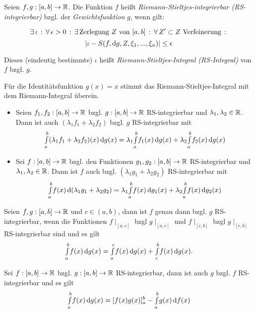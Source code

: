 \documentclass{cheat-sheet}
\begin{document}
\begin{defn}
Seien $f, g : [a, b] \to \mathbb{R}$. Die Funktion $f$ heißt \emph{Riemann-Stieltjes-integrierbar (RS-integrierbar)} bzgl. der \emph{Gewichtsfunktion} $g$, wenn gilt:

\[ \exists \, {\iota} \,:\, \forall \, {\epsilon > 0} \,:\, \exists \, {\text{Zerlegung $Z$ von $[a, b]$}} \,:\, \forall \, {Z' \subset Z \text{ Verfeinerung}} \,:\, \]
\[ \lvert\iota - S(f, \mathrm{d} g, Z, \xi_1, ..., \xi_n)\rvert \le \epsilon \]

Dieses (eindeutig bestimmte) $\iota$ heißt \emph{Riemann-Stieltjes-Integral (RS-Integral)} von $f$ bzgl. $g$.
\end{defn}

\begin{bem}
Für die Identitätsfunktion $g(x) = x$ stimmt das Riemann-Stieltjes-Integral mit dem Riemann-Integral überein.
\end{bem}


\begin{satz}
\begin{itemize}
  \item Seien $f_1, f_2 : [a, b] \to \mathbb{R}$ bzgl. $g : [a, b] \to \mathbb{R}$ RS-integrierbar und $\lambda_1, \lambda_2 \in \mathbb{R}$. Dann ist auch $(\lambda_1 f_1 + \lambda_2 f_2)$ bzgl. $g$ RS-integrierbar mit
  \[ {\textstyle \int\limits_{a}^{b}} (\lambda_1 f_1 + \lambda_2 f_2)(x) \,\mathrm{d} g(x) = \lambda_1 {\textstyle \int\limits_{a}^{b}} f_1(x) \,\mathrm{d} g(x) + \lambda_2 {\textstyle \int\limits_{a}^{b}} f_2(x) \,\mathrm{d} g(x) \]
  \item Sei $f : [a, b] \to \mathbb{R}$ bzgl. den Funktionen $g_1, g_2 : [a, b] \to \mathbb{R}$ RS-integrierbar und $\lambda_1, \lambda_2 \in \mathbb{R}$. Dann ist $f$ auch bzgl. $(\lambda_1 g_1 + \lambda_2 g_2)$ RS-integrierbar mit
  \[ {\textstyle \int\limits_{a}^{b}} f(x) \,\mathrm{d} (\lambda_1 g_1 + \lambda_2 g_2) = \lambda_1 {\textstyle \int\limits_{a}^{b}} f(x) \,\mathrm{d} g_1(x) + \lambda_2 {\textstyle \int\limits_{a}^{b}} f(x) \,\mathrm{d} g_2(x) \]
\end{itemize}
\end{satz}

\begin{satz}
Seien $f, g : [a, b] \to \mathbb{R}$ und $c \in (a, b)$, dann ist $f$ genau dann bzgl. $g$ RS-integrierbar, wenn die Funktionen $f\mid_{[a, c]}$ bzgl $g\mid_{[a, c]}$ und $f\mid_{[c, b]}$ bzgl $g\mid_{[c, b]}$ RS-integrierbar sind und es gilt
\[ {\textstyle \int\limits_{a}^{b}} f(x) \,\mathrm{d} g(x) = {\textstyle \int\limits_{a}^{c}} f(x) \,\mathrm{d} g(x) + {\textstyle \int\limits_{c}^{b}} f(x) \,\mathrm{d} g(x). \]
\end{satz}

\begin{satz}
Sei $f : [a, b] \to \mathbb{R}$ bzgl. $g : [a, b] \to \mathbb{R}$ RS-integrierbar, dann ist auch $g$ bzgl. $f$ RS-integrierbar und es gilt
\[ {\textstyle \int\limits_{a}^{b}} f(x) \,\mathrm{d} g(x) = [f(x)g(x)]_a^b - {\textstyle \int\limits_{a}^{b}} g(x) \,\mathrm{d} f(x) \]
\end{satz}
\end{document}
